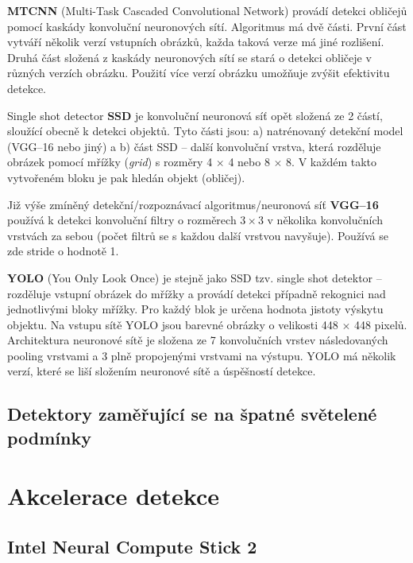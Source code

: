 \textbf{MTCNN} (Multi-Task Cascaded Convolutional Network) \cite{fdCNNComparison} provádí detekci obličejů pomocí kaskády konvoluční neuronových sítí. Algoritmus má dvě části. První část vytváří několik verzí vstupních obrázků, každa taková verze má jiné rozlišení. Druhá část složená z kaskády neuronových sítí se stará o detekci obličeje v různých verzích obrázku. Použití více verzí obrázku umožňuje zvýšit efektivitu detekce.

Single shot detector \textbf{SSD} \cite{ssd} je konvoluční neuronová síť opět složená ze 2 částí, sloužící obecně k detekci objektů. Tyto části jsou: a) natrénovaný detekční model (VGG--16 nebo jiný) a b) část SSD -- další konvoluční vrstva, která rozděluje obrázek pomocí mřížky (\emph{grid}) s rozměry 4 $\times$ 4 nebo 8 $\times$ 8. V každém takto vytvořeném bloku je pak hledán objekt (obličej).

Již výše zmíněný detekční/rozpoznávací algoritmus/neuronová síť \textbf{VGG--16} \cite{vgg-16} používá k detekci konvoluční filtry o rozměrech $3 \times 3$ v několika konvolučních vrstvách za sebou (počet filtrů se s každou další vrstvou navyšuje). Používá se zde stride o hodnotě 1.

\textbf{YOLO} (You Only Look Once) \cite{yolo} je stejně jako SSD tzv. single shot detektor -- rozděluje vstupní obrázek do mřížky a provádí detekci případně rekognici nad jednotlivými bloky mřížky. Pro každý blok je určena hodnota jistoty výskytu objektu. Na vstupu sítě YOLO jsou barevné obrázky o velikosti 448 $\times$ 448 pixelů. Architektura neuronové sítě je složena ze 7 konvolučních vrstev následovaných pooling vrstvami a 3 plně propojenými vrstvami na výstupu.
YOLO má několik verzí, které se liší složením neuronové sítě a úspěšností detekce.


\subsection*{Detektory zaměřující se na špatné světelené podmínky}

\section{Akcelerace detekce}
\label{sekce:akcelerace}

\subsection*{Intel Neural Compute Stick 2}





